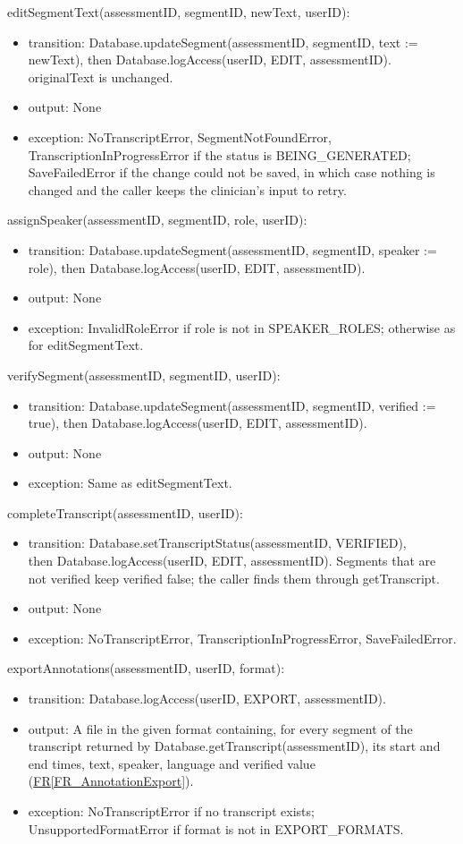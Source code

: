 \documentclass[12pt, titlepage]{article}
\newcommand{\srsref}[2]{\href{https://github.com/Nour-Fawaz/MacaBoca/blob/main/pdfs/SRS/SRS.pdf}{#1\ref*{#2}}}
\begin{document}
\noindent editSegmentText(assessmentID, segmentID, newText, userID):
\begin{itemize}
\item transition: Database.updateSegment(assessmentID, segmentID, text := newText), then Database.logAccess(userID, EDIT, assessmentID). originalText is unchanged.
\item output: None
\item exception: NoTranscriptError, SegmentNotFoundError, TranscriptionInProgressError if the status is BEING\_GENERATED; SaveFailedError if the change could not be saved, in which case nothing is changed and the caller keeps the clinician's input to retry.
\end{itemize}

\noindent assignSpeaker(assessmentID, segmentID, role, userID):
\begin{itemize}
\item transition: Database.updateSegment(assessmentID, segmentID, speaker := role), then Database.logAccess(userID, EDIT, assessmentID).
\item output: None
\item exception: InvalidRoleError if role is not in SPEAKER\_ROLES; otherwise as for editSegmentText.
\end{itemize}

\noindent verifySegment(assessmentID, segmentID, userID):
\begin{itemize}
\item transition: Database.updateSegment(assessmentID, segmentID, verified := true), then Database.logAccess(userID, EDIT, assessmentID).
\item output: None
\item exception: Same as editSegmentText.
\end{itemize}

\noindent completeTranscript(assessmentID, userID):
\begin{itemize}
\item transition: Database.setTranscriptStatus(assessmentID, VERIFIED), \\ then Database.logAccess(userID, EDIT, assessmentID). Segments that are not verified keep verified false; the caller finds them through getTranscript.
\item output: None
\item exception: NoTranscriptError, TranscriptionInProgressError, SaveFailedError.
\end{itemize}

\noindent exportAnnotations(assessmentID, userID, format):
\begin{itemize}
\item transition: Database.logAccess(userID, EXPORT, assessmentID).
\item output: A file in the given format containing, for every segment of the transcript returned by Database.getTranscript(assessmentID), its start and end times, text, speaker, language and verified value (\srsref{FR}{FR_AnnotationExport}).
\item exception: NoTranscriptError if no transcript exists; UnsupportedFormatError if format is not in EXPORT\_FORMATS.
\end{itemize}
\end{document}
